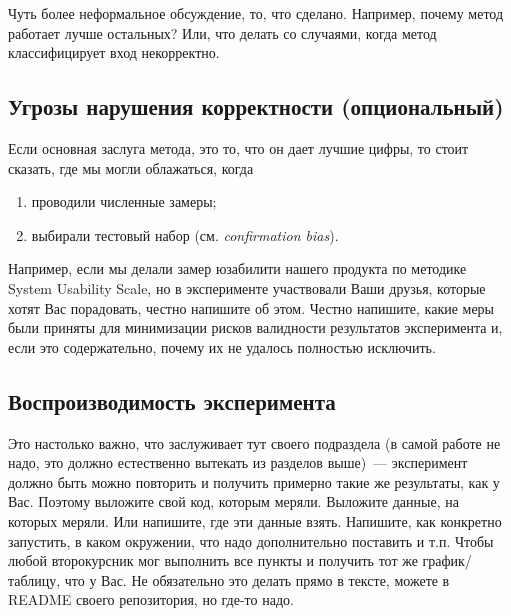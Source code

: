 Чуть более неформальное обсуждение, то, что сделано.
Например, почему метод работает лучше остальных?
Или, что делать со случаями, когда метод классифицирует вход некорректно.

\subsection{Угрозы нарушения корректности (опциональный)}

Если основная заслуга метода, это то, что он дает лучшие цифры, то стоит сказать, где мы могли облажаться, когда
\begin{enumerate}
    \item проводили численные замеры;
    \item выбирали тестовый набор (см. \emph{confirmation bias}).
\end{enumerate}

Например, если мы делали замер юзабилити нашего продукта по методике System Usability Scale, но в эксперименте участвовали Ваши друзья, которые хотят Вас порадовать, честно напишите об этом.
Честно напишите, какие меры были приняты для минимизации рисков валидности результатов эксперимента и, если это содержательно, почему их не удалось полностью исключить.

\subsection{Воспроизводимость эксперимента}

Это настолько важно, что заслуживает тут своего подраздела (в самой работе не надо, это должно естественно вытекать из разделов выше)~--- эксперимент должно быть можно повторить и получить примерно такие же результаты, как у Вас.
Поэтому выложите свой код, которым меряли.
Выложите данные, на которых меряли.
Или напишите, где эти данные взять.
Напишите, как конкретно запустить, в каком окружении, что надо дополнительно поставить и т.п.
Чтобы любой второкурсник мог выполнить все пункты и получить тот же график/таблицу, что у Вас.
Не обязательно это делать прямо в тексте, можете в README своего репозитория, но где-то надо.
